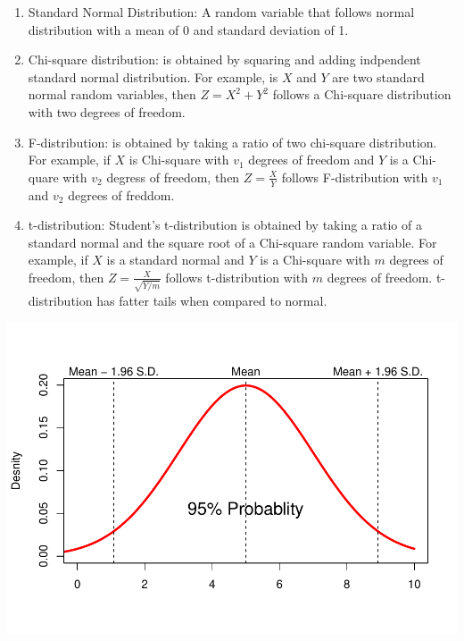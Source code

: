 \documentclass[]{book}
\theoremstyle{definition}
\theoremstyle{definition}
\theoremstyle{definition}
\theoremstyle{remark}
\begin{document}
\begin{enumerate}
\def\labelenumi{\arabic{enumi}.}
\item
  Standard Normal Distribution: A random variable that follows normal distribution with a mean of 0 and standard deviation of 1.
\item
  Chi-square distribution: is obtained by squaring and adding indpendent standard normal distribution. For example, is \(X\) and \(Y\) are two standard normal random variables, then \(Z=X^2 + Y^2\) follows a Chi-square distribution with two degrees of freedom.
\item
  F-distribution: is obtained by taking a ratio of two chi-square distribution. For example, if \(X\) is Chi-square with \(v_1\) degrees of freedom and \(Y\) is a Chi-quare with \(v_2\) degress of freedom, then \(\displaystyle{Z=\frac{X}{Y}}\) follows F-distribution with \(v_1\) and \(v_2\) degrees of freddom.
\item
  t-distribution: Student's t-distribution is obtained by taking a ratio of a standard normal and the square root of a Chi-square random variable. For example, if \(X\) is a standard normal and \(Y\) is a Chi-square with \(m\) degrees of freedom, then \(Z=\displaystyle\frac{X}{\sqrt{Y/m}}\) follows t-distribution with \(m\) degrees of freedom. t-distribution has fatter tails when compared to normal.
\end{enumerate}

\begin{center}\includegraphics{bookdown-demo_files/figure-latex/unnamed-chunk-52-1} \end{center}
\end{document}
